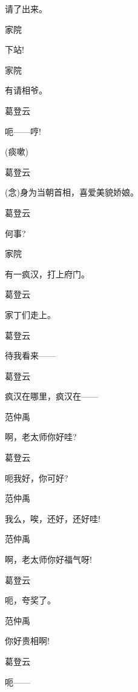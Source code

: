请了出来。

家院\hspace{30pt}~

下站!

家院\hspace{30pt}~

有请相爷。

葛登云\hspace{20pt}~

呃------哼!

(痰嗽)

葛登云\hspace{20pt}~

({\akai 念})身为当朝首相，喜爱美貌娇娘。

葛登云\hspace{20pt}~

何事?

家院\hspace{30pt}~

有一疯汉，打上府门。

葛登云\hspace{20pt}~

家丁们走上。

葛登云\hspace{20pt}~

待我看来------

葛登云\hspace{20pt}~

疯汉在哪里，疯汉在------

范仲禹\hspace{20pt}~

啊，老太师你好哇?

葛登云\hspace{20pt}~

呃我好，你可好?

范仲禹\hspace{20pt}~

我么，唉，还好，还好哇!

范仲禹\hspace{20pt}~

啊，老太师你好福气呀!

葛登云\hspace{20pt}~

呃，夸奖了。

范仲禹\hspace{20pt}~

你好贵相啊!

葛登云\hspace{20pt}~

呃------

